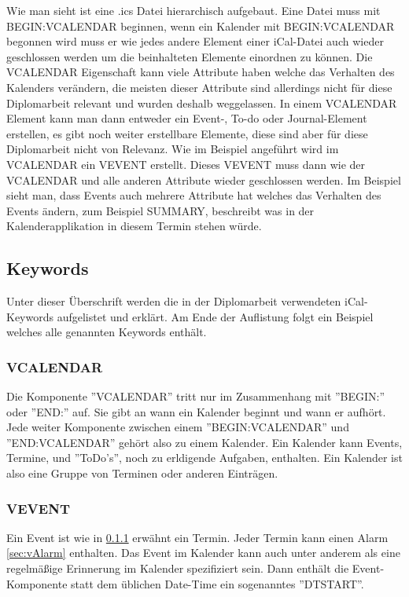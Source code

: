 Wie man sieht ist eine .ics Datei hierarchisch aufgebaut. Eine Datei muss mit BEGIN:VCALENDAR beginnen, wenn ein Kalender mit BEGIN:VCALENDAR begonnen wird muss er wie jedes andere Element einer iCal-Datei auch wieder geschlossen werden um die beinhalteten Elemente einordnen zu können. Die VCALENDAR Eigenschaft kann viele Attribute haben welche das Verhalten des Kalenders verändern, die meisten dieser Attribute sind allerdings nicht für diese Diplomarbeit relevant und wurden deshalb weggelassen. In einem VCALENDAR Element kann man dann entweder ein Event-, To-do oder Journal-Element erstellen, es gibt noch weiter erstellbare Elemente, diese sind aber für diese Diplomarbeit nicht von Relevanz. Wie im Beispiel angeführt wird im VCALENDAR ein VEVENT erstellt. Dieses VEVENT muss dann wie der VCALENDAR und alle anderen Attribute wieder geschlossen werden. Im Beispiel sieht man, dass Events auch mehrere Attribute hat welches das Verhalten des Events ändern, zum Beispiel SUMMARY, beschreibt was in der Kalenderapplikation in diesem Termin stehen würde.\\

\pagebreak
\renewcommand{\theauthor}{Dario Wagner}
\subsection{Keywords}
\label{sec:keywords}
Unter dieser Überschrift werden die in der Diplomarbeit verwendeten iCal-Keywords aufgelistet und erklärt. Am Ende der Auflistung folgt ein Beispiel welches alle genannten Keywords enthält. 
\subsubsection{VCALENDAR}
\label{sec:vCalendar} 
Die Komponente ''VCALENDAR'' tritt nur im Zusammenhang mit ''BEGIN:'' oder ''END:'' auf. Sie gibt an wann ein Kalender beginnt und wann er aufhört. Jede weiter Komponente zwischen einem ''BEGIN:VCALENDAR'' und ''END:VCALENDAR'' gehört also zu einem Kalender. Ein Kalender kann Events, Termine, und ''ToDo's'', noch zu erldigende Aufgaben, enthalten. Ein Kalender ist also eine Gruppe von Terminen oder anderen Einträgen. 
\subsubsection{VEVENT}
\label{sec:vEvent} 
Ein Event ist wie in \ref{sec:vCalendar} erwähnt ein Termin. Jeder Termin kann einen Alarm \ref{sec:vAlarm} enthalten. Das Event im Kalender kann auch unter anderem als eine regelmäßige Erinnerung im Kalender spezifiziert sein. Dann enthält die Event-Komponente statt dem üblichen Date-Time ein sogenanntes ''DTSTART''.
